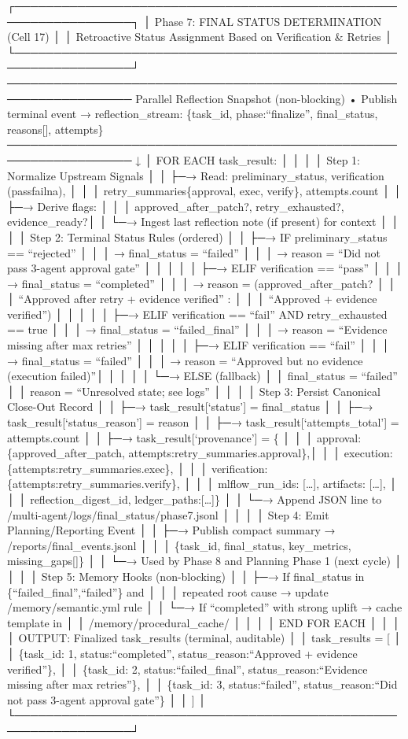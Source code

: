 \documentclass[
]{article}
\begin{document}
┌─────────────────────────────────────────────────────────────────┐ │
Phase 7: FINAL STATUS DETERMINATION (Cell 17) │ │ Retroactive Status
Assignment Based on Verification \& Retries │
└─────────────────────────────────────────────────────────────────┘
──────────────────────────────────────────────────────────────────
Parallel Reflection Snapshot (non-blocking) • Publish terminal event →
reflection\_stream: \{task\_id, phase:``finalize'', final\_status,
reasons{[}{]}, attempts\}
────────────────────────────────────────────────────────────────── ↓ │
FOR EACH task\_result: │ │ │ │ Step 1: Normalize Upstream Signals │ │
├─→ Read: preliminary\_status, verification
(pass\textbar fail\textbar na), │ │ │ retry\_summaries\{approval, exec,
verify\}, attempts.count │ │ ├─→ Derive flags: │ │ │
approved\_after\_patch?, retry\_exhausted?, evidence\_ready?│ │ └─→
Ingest last reflection note (if present) for context │ │ │ │ Step 2:
Terminal Status Rules (ordered) │ │ ├─→ IF preliminary\_status ==
``rejected'' │ │ │ → final\_status = ``failed'' │ │ │ → reason = ``Did
not pass 3-agent approval gate'' │ │ │ │ │ ├─→ ELIF verification ==
``pass'' │ │ │ → final\_status = ``completed'' │ │ │ → reason =
(approved\_after\_patch? │ │ │ ``Approved after retry + evidence
verified'' : │ │ │ ``Approved + evidence verified'') │ │ │ │ │ ├─→ ELIF
verification == ``fail'' AND retry\_exhausted == true │ │ │ →
final\_status = ``failed\_final'' │ │ │ → reason = ``Evidence missing
after max retries'' │ │ │ │ │ ├─→ ELIF verification == ``fail'' │ │ │ →
final\_status = ``failed'' │ │ │ → reason = ``Approved but no evidence
(execution failed)''│ │ │ │ │ └─→ ELSE (fallback) │ │ final\_status =
``failed'' │ │ reason = ``Unresolved state; see logs'' │ │ │ │ Step 3:
Persist Canonical Close-Out Record │ │ ├─→ task\_result{[}`status'{]} =
final\_status │ │ ├─→ task\_result{[}`status\_reason'{]} = reason │ │
├─→ task\_result{[}`attempts\_total'{]} = attempts.count │ │ ├─→
task\_result{[}`provenance'{]} = \{ │ │ │
approval:\{approved\_after\_patch,
attempts:retry\_summaries.approval\},│ │ │
execution:\{attempts:retry\_summaries.exec\}, │ │ │
verification:\{attempts:retry\_summaries.verify\}, │ │ │
mlflow\_run\_ids: {[}\ldots{]}, artifacts: {[}\ldots{]}, │ │ │
reflection\_digest\_id, ledger\_paths:{[}\ldots{]}\} │ │ └─→ Append JSON
line to /multi-agent/logs/final\_status/phase7.jsonl │ │ │ │ Step 4:
Emit Planning/Reporting Event │ │ ├─→ Publish compact summary →
/reports/final\_events.jsonl │ │ │ \{task\_id, final\_status,
key\_metrics, missing\_gaps{[}{]}\} │ │ └─→ Used by Phase 8 and Planning
Phase 1 (next cycle) │ │ │ │ Step 5: Memory Hooks (non-blocking) │ │ ├─→
If final\_status in \{``failed\_final'',``failed''\} and │ │ │ repeated
root cause → update /memory/semantic.yml rule │ │ └─→ If ``completed''
with strong uplift → cache template in │ │ /memory/procedural\_cache/ │
│ │ │ END FOR EACH │ │ │ │ OUTPUT: Finalized task\_results (terminal,
auditable) │ │ task\_results = {[} │ │ \{task\_id: 1,
status:``completed'', status\_reason:``Approved + evidence verified''\},
│ │ \{task\_id: 2, status:``failed\_final'', status\_reason:``Evidence
missing after max retries''\}, │ │ \{task\_id: 3, status:``failed'',
status\_reason:``Did not pass 3-agent approval gate''\} │ │ {]} │
└─────────────────────────────────────────────────────────────────┘
\end{document}
